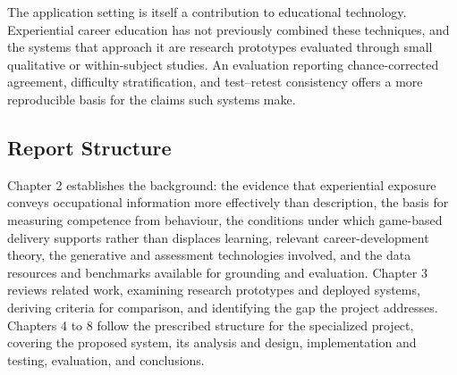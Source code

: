 The application setting is itself a contribution to educational technology. Experiential career education has not previously combined these techniques, and the systems that approach it are research prototypes evaluated through small qualitative or within-subject studies. An evaluation reporting chance-corrected agreement, difficulty stratification, and test--retest consistency offers a more reproducible basis for the claims such systems make.

\subsection{Report Structure}

Chapter 2 establishes the background: the evidence that experiential exposure conveys occupational information more effectively than description, the basis for measuring competence from behaviour, the conditions under which game-based delivery supports rather than displaces learning, relevant career-development theory, the generative and assessment technologies involved, and the data resources and benchmarks available for grounding and evaluation. Chapter 3 reviews related work, examining research prototypes and deployed systems, deriving criteria for comparison, and identifying the gap the project addresses. Chapters 4 to 8 follow the prescribed structure for the specialized project, covering the proposed system, its analysis and design, implementation and testing, evaluation, and conclusions.
